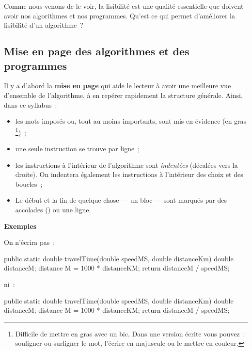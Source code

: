 		Comme nous venons de le voir, la lisibilité est une qualité essentielle
		que doivent avoir nos algorithmes et nos programmes.  Qu’est ce qui
		permet d’améliorer la lisibilité d’un algorithme~?

		\subsection{Mise en page des algorithmes et des programmes} 
		
			Il y a d’abord la \textbf{mise en page} qui aide le lecteur à avoir
			une meilleure vue d’ensemble de l’algorithme, à en repérer
			rapidement la structure générale.  Ainsi, dans ce syllabus~:

			\begin{itemize}
			\item 
				les mots imposés ou, tout au moins importants, 
				sont mis en évidence (en gras%
				\footnote{%
					Difficile de mettre en gras avec un bic.
					Dans une version écrite vous pouvez~:
					souligner ou surligner le mot, l’écrire en majuscule
					ou le mettre en couleur.%
				})~;
			\item
				une seule instruction se trouve par ligne~;
			\item
				les instructions à l’intérieur de l’algorithme sont 
				\emph{indentées}
				(décalées vers la droite).
				On indentera également les instructions
				à l’intérieur des choix et des boucles~;
			\item

				Le début et la fin de quelque chose — un bloc — sont marqués 
				par des accolades ({}) ou une ligne. 
			\end{itemize}
			
			\textbf{Exemples}

			On n'écrira pas~:

			\begin{java}
public static double travelTime(double speedMS, double distanceKm) {
double distanceM;
distance M = 1000 * distanceKM;
return distanceM / speedMS;
}
			\end{java}

			ni~:
			
			\begin{java}
public static double travelTime(double speedMS, double distanceKm) {
	double distanceM;
		distance M = 1000 * distanceKM; return distanceM / speedMS; }
			\end{java}

